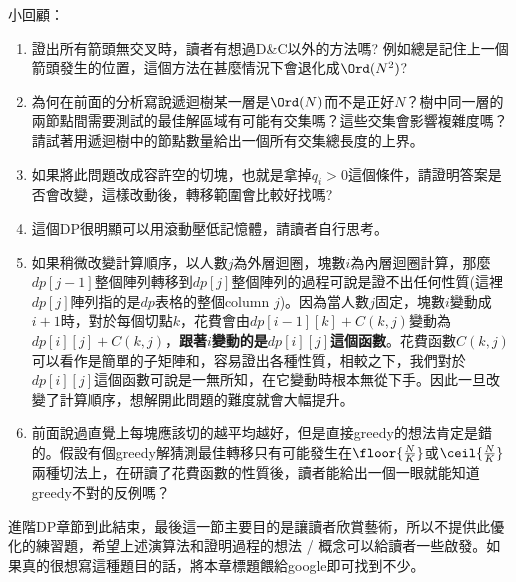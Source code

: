 小回顧：
\begin{enumerate}
\item 證出所有箭頭無交叉時，讀者有想過D\&C以外的方法嗎? 例如總是記住上一個箭頭發生的位置，這個方法在甚麼情況下會退化成$\Ord(N^2)$?
\item 為何在前面的分析寫說遞迴樹某一層是$\Ord(N)$而不是正好$N$？樹中同一層的兩節點間需要測試的最佳解區域有可能有交集嗎？這些交集會影響複雜度嗎？請試著用遞迴樹中的節點數量給出一個所有交集總長度的上界。
\item 如果將此問題改成容許空的切塊，也就是拿掉$q_i > 0$這個條件，請證明答案是否會改變，這樣改動後，轉移範圍會比較好找嗎?
\item 這個DP很明顯可以用滾動壓低記憶體，請讀者自行思考。
\item 如果稍微改變計算順序，以人數$j$為外層迴圈，塊數$i$為內層迴圈計算，那麼$dp[j - 1]$整個陣列轉移到$dp[j]$整個陣列的過程可說是證不出任何性質(這裡$dp[j]$陣列指的是$dp$表格的整個column $j$)。因為當人數$j$固定，塊數$i$變動成$i + 1$時，對於每個切點$k$，花費會由$dp[i - 1][k] + C(k, j)$變動為$dp[i][j] + C(k, j)$，\textbf{跟著$i$變動的是$dp[i][j]$這個函數}。花費函數$C(k, j)$可以看作是簡單的子矩陣和，容易證出各種性質，相較之下，我們對於$dp[i][j]$這個函數可說是一無所知，在它變動時根本無從下手。因此一旦改變了計算順序，想解開此問題的難度就會大幅提升。
\item 前面說過直覺上每塊應該切的越平均越好，但是直接greedy的想法肯定是錯的。假設有個greedy解猜測最佳轉移只有可能發生在$\floor{\frac{N}{K}}$或$\ceil{\frac{N}{K}}$兩種切法上，在研讀了花費函數的性質後，讀者能給出一個一眼就能知道greedy不對的反例嗎？
\end{enumerate}

進階DP章節到此結束，最後這一節主要目的是讓讀者欣賞藝術，所以不提供此優化的練習題，希望上述演算法和證明過程的想法 / 概念可以給讀者一些啟發。如果真的很想寫這種題目的話，將本章標題餵給google即可找到不少。

